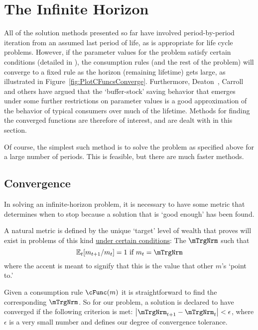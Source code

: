 \documentclass[titlepage, headings=optiontotocandhead]{Resources/texmf-local/tex/latex/econtex}
\newcommand{\MoM}{\ifthenelse{\boolean{MoMVersion}}}
\begin{document}
\hypertarget{the-infinite-horizon}{}
\section{The Infinite Horizon}\label{sec:the-infinite-horizon}

All of the solution methods presented so far have involved period-by-period iteration from an assumed last period of life, as is appropriate for life cycle problems.  However, if the parameter values for the problem satisfy certain conditions (detailed in \cite{BufferStockTheory}), the consumption rules (and the rest of the problem) will converge to a fixed rule as the horizon (remaining lifetime) gets large, as illustrated in Figure~\ref{fig:PlotCFuncsConverge}.  Furthermore, Deaton~\citeyearpar{deatonLiqConstr}, Carroll~\citeyearpar{carroll:brookings,carrollBSLCPIH} and others have argued that the `buffer-stock' saving behavior that emerges under some further restrictions on parameter values is a good approximation of the behavior of typical consumers over much of the lifetime.  Methods for finding the converged functions are therefore of interest, and are dealt with in this section.

Of course, the simplest such method is to solve the problem as
specified above for a large number of periods.  This is feasible, but
there are much faster methods.

\subsection{Convergence}

In solving an infinite-horizon problem, it is necessary to have some
metric that determines when to stop because a solution that is `good
enough' has been found.

A natural metric is defined by the unique `target' level of wealth that \cite{BufferStockTheory} proves
will exist in problems of this kind \href{https://llorracc.github.io/BufferStockTheory#GICNrm}{under certain conditions}: The $\mTrgNrm$ such that
\begin{equation}
  \Ex_t [{m}_{t+1}/m_t] = 1 \mbox{~if~} m_t = \mTrgNrm  \label{eq:mTrgNrmet}
\end{equation}
where the accent is meant to signify that this is the value
that other $m$'s `point to.'

Given a consumption rule $\cFunc(m)$ it is straightforward to find
the corresponding $\mTrgNrm$.  So for our problem, a solution is declared
to have converged if the following criterion is met:
$\left|\mTrgNrm_{t+1}-\mTrgNrm_{t}\right| < \epsilon$, where $\epsilon$ is
a very small number and defines our degree of convergence tolerance.
\end{document}
